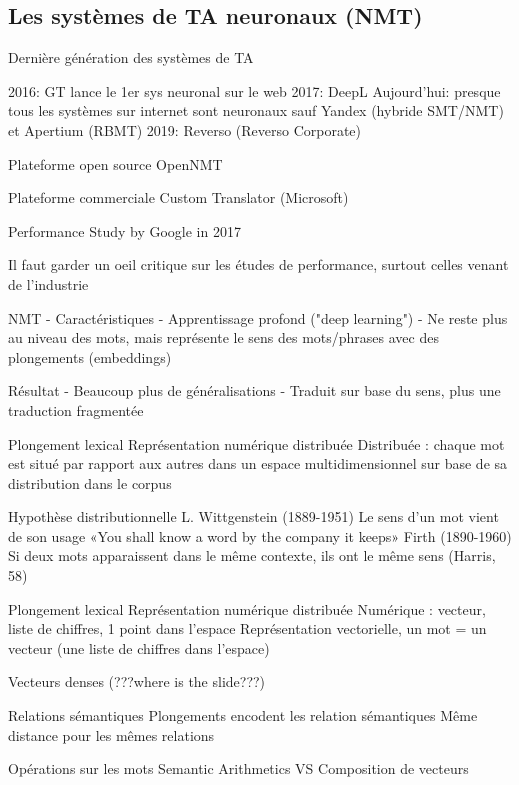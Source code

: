 \vspace{-1.2cm}

\subsection{Les systèmes de TA neuronaux (NMT)}

Dernière génération des systèmes de TA

2016: GT lance le 1er sys neuronal sur le web
2017: DeepL
Aujourd'hui: presque tous les systèmes sur internet sont neuronaux sauf Yandex (hybride SMT/NMT) et Apertium (RBMT)
2019: Reverso (Reverso Corporate)

Plateforme open source
OpenNMT

Plateforme commerciale
Custom Translator (Microsoft)

Performance
Study by Google in 2017

Il faut garder un oeil critique sur les études de performance, surtout celles venant de l'industrie

NMT - Caractéristiques
- Apprentissage profond ("deep learning")
- Ne reste plus au niveau des mots, mais représente le sens des mots/phrases avec des plongements (embeddings)

Résultat
- Beaucoup plus de généralisations
- Traduit sur base du sens, plus une traduction fragmentée

Plongement lexical
    Représentation numérique distribuée
    Distribuée : chaque mot est situé par rapport aux autres dans un espace multidimensionnel sur base de sa distribution dans le corpus

Hypothèse distributionnelle
    L. Wittgenstein (1889-1951)
        Le sens d’un mot vient de son usage
    «You shall know a word by the company it keeps»
        Firth (1890-1960)
    Si deux mots apparaissent dans le même contexte, ils ont le même sens (Harris, 58)

Plongement lexical
    Représentation numérique distribuée
    Numérique : vecteur, liste de chiffres, 1 point dans l’espace
    Représentation vectorielle, un mot = un vecteur (une liste de chiffres dans l'espace)

Vecteurs denses (???where is the slide???)

Relations sémantiques
    Plongements encodent les relation sémantiques
    Même distance pour les mêmes relations

Opérations sur les mots
    Semantic Arithmetics
    VS
    Composition de vecteurs

